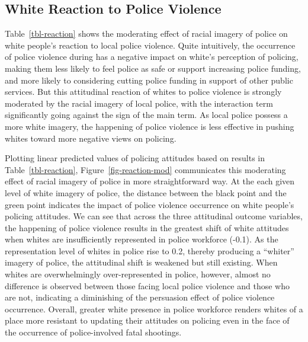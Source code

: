 \documentclass[
  12pt,
]{article}
\begin{document}
\hypertarget{white-reaction-to-police-violence}{%
\subsection{White Reaction to Police
Violence}\label{white-reaction-to-police-violence}}

Table~\ref{tbl-reaction} shows the moderating effect of racial imagery
of police on white people's reaction to local police violence. Quite
intuitively, the occurrence of police violence during has a negative
impact on white's perception of policing, making them less likely to
feel police as safe or support increasing police funding, and more
likely to considering cutting police funding in support of other public
services. But this attitudinal reaction of whites to police violence is
strongly moderated by the racial imagery of local police, with the
interaction term significantly going against the sign of the main term.
As local police possess a more white imagery, the happening of police
violence is less effective in pushing whites toward more negative views
on policing.

Plotting linear predicted values of policing attitudes based on results
in Table~\ref{tbl-reaction}, Figure~\ref{fig-reaction-mod} communicates
this moderating effect of racial imagery of police in more
straightforward way. At the each given level of white imagery of police,
the distance between the black point and the green point indicates the
impact of police violence occurrence on white people's policing
attitudes. We can see that across the three attitudinal outcome
variables, the happening of police violence results in the greatest
shift of white attitudes when whites are insufficiently represented in
police workforce (-0.1). As the representation level of whites in police
rise to 0.2, thereby producing a ``whiter'' imagery of police, the
attitudinal shift is weakened but still existing. When whites are
overwhelmingly over-represented in police, however, almost no difference
is observed between those facing local police violence and those who are
not, indicating a diminishing of the persuasion effect of police
violence occurrence. Overall, greater white presence in police workforce
renders whites of a place more resistant to updating their attitudes on
policing even in the face of the occurrence of police-involved fatal
shootings.
\end{document}
